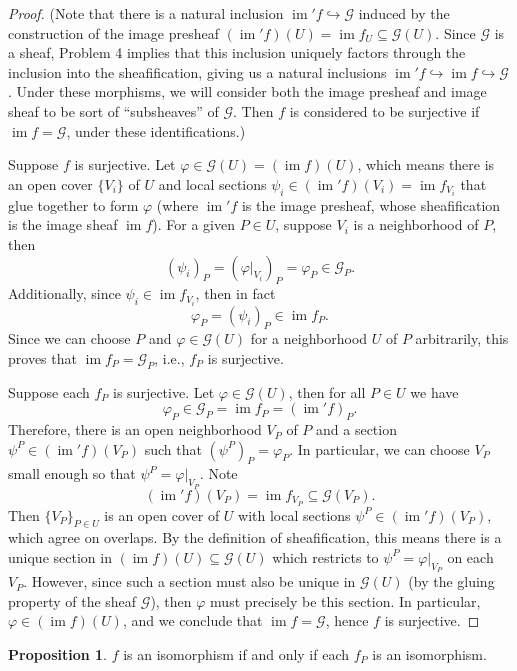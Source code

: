\documentclass[12pt]{article}
\theoremstyle{definition}
\newtheorem{proposition}{Proposition}
\renewcommand{\phi}{\varphi}
\newcommand{\<}{\langle}
\renewcommand{\>}{\rangle}
\newcommand{\seq}{\subseteq}
\DeclareMathOperator{\im}{im}
\newcommand{\GG}{\mathcal{G}}
\newcommand{\inc}{\hookrightarrow}
\begin{document}
\begin{proof}
    (Note that there is a natural inclusion $\im' f \inc \GG$ induced by the construction of the image presheaf $(\im' f)(U) = \im f_U \seq \GG(U)$.
    Since $\GG$ is a sheaf, Problem 4 implies that this inclusion uniquely factors through the inclusion into the sheafification, giving us a natural inclusions $\im' f \inc \im f \inc \GG$.
    Under these morphisms, we will consider both the image presheaf and image sheaf to be sort of ``subsheaves'' of $\GG$.
    Then $f$ is considered to be surjective if $\im f = \GG$, under these identifications.)

    Suppose $f$ is surjective.
    Let $\phi \in \GG(U) = (\im f)(U)$, which means there is an open cover $\{V_i\}$ of $U$ and local sections $\psi_i \in (\im' f)(V_i) = \im f_{V_i}$ that glue together to form $\phi$ (where $\im' f$ is the image presheaf, whose sheafification is the image sheaf $\im f$).
    For a given $P \in U$, suppose $V_i$ is a neighborhood of $P$, then
    \[
        (\psi_i)_P = (\phi|_{V_i})_P = \phi_P \in \GG_P.
    \]
    Additionally, since $\psi_i \in \im f_{V_i}$, then in fact
    \[
        \phi_P = (\psi_i)_P \in \im f_P.
    \]
    Since we can choose $P$ and $\phi \in \GG(U)$ for a neighborhood $U$ of $P$ arbitrarily, this proves that $\im f_P = \GG_P$, i.e., $f_P$ is surjective.

    Suppose each $f_P$ is surjective.
    Let $\phi \in \GG(U)$, then for all $P \in U$ we have
    \[
        \phi_P \in \GG_P = \im f_P = (\im' f)_P.
    \]
    Therefore, there is an open neighborhood $V_P$ of $P$ and a section $\psi^P \in (\im' f)(V_P)$ such that
    $(\psi^P)_P = \phi_P$.
    In particular, we can choose $V_P$ small enough so that $\psi^P = \phi|_{V_P}$.
    Note
    \[
        (\im' f)(V_P) = \im f_{V_P} \seq \GG(V_P).
    \]
    Then $\{V_P\}_{P \in U}$ is an open cover of $U$ with local sections $\psi^P \in (\im' f)(V_P)$, which agree on overlaps.
    By the definition of sheafification, this means there is a unique section in $(\im f)(U) \seq \GG(U)$ which restricts to $\psi^P = \phi|_{V_P}$ on each $V_P$.
    However, since such a section must also be unique in $\GG(U)$ (by the gluing property of the sheaf $\GG$), then $\phi$ must precisely be this section.
    In particular, $\phi \in (\im f)(U)$, and we conclude that $\im f = \GG$, hence $f$ is surjective.
\end{proof}

\begin{proposition}
    $f$ is an isomorphism if and only if each $f_P$ is an isomorphism.
\end{proposition}
\end{document}
